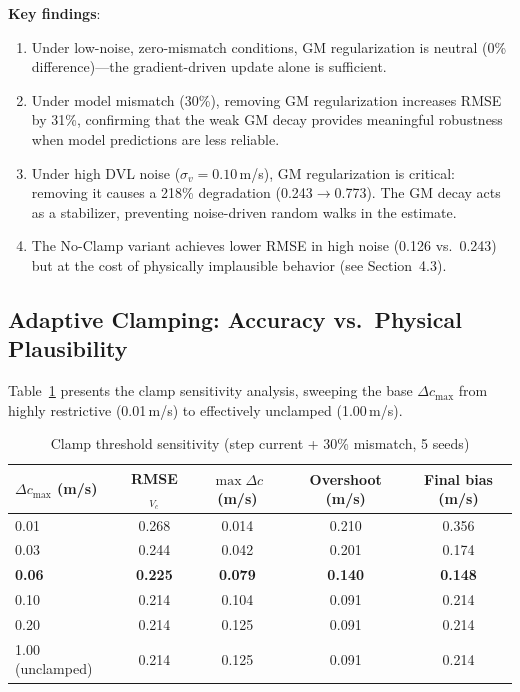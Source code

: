 \textbf{Key findings}:
\begin{enumerate}[itemsep=0pt,topsep=4pt]
    \item Under low-noise, zero-mismatch conditions, GM regularization is neutral (0\% difference)---the gradient-driven update alone is sufficient.
    \item Under model mismatch (30\%), removing GM regularization increases RMSE by 31\%, confirming that the weak GM decay provides meaningful robustness when model predictions are less reliable.
    \item Under high DVL noise ($\sigma_v=0.10$\,m/s), GM regularization is critical: removing it causes a 218\% degradation (0.243$\rightarrow$0.773). The GM decay acts as a stabilizer, preventing noise-driven random walks in the estimate.
    \item The No-Clamp variant achieves lower RMSE in high noise (0.126 vs.\ 0.243) but at the cost of physically implausible behavior (see Section~4.3).
\end{enumerate}

\subsection{Adaptive Clamping: Accuracy vs.\ Physical Plausibility}

Table~\ref{tab:clamp_sensitivity} presents the clamp sensitivity analysis, sweeping the base $\Delta c_{\max}$ from highly restrictive (0.01\,m/s) to effectively unclamped (1.00\,m/s).

\begin{table}[h]
\centering
\caption{Clamp threshold sensitivity (step current + 30\% mismatch, 5 seeds)}
\label{tab:clamp_sensitivity}
\begin{tabular}{lcccc}
\toprule
$\Delta c_{\max}$ (m/s) & RMSE$_{V_c}$ & $\max\Delta c$ (m/s) & Overshoot (m/s) & Final bias (m/s) \\
\midrule
0.01 & 0.268 & 0.014 & 0.210 & 0.356 \\
0.03 & 0.244 & 0.042 & 0.201 & 0.174 \\
\textbf{0.06} & \textbf{0.225} & \textbf{0.079} & \textbf{0.140} & \textbf{0.148} \\
0.10 & 0.214 & 0.104 & 0.091 & 0.214 \\
0.20 & 0.214 & 0.125 & 0.091 & 0.214 \\
1.00 (unclamped) & 0.214 & 0.125 & 0.091 & 0.214 \\
\bottomrule
\end{tabular}
\end{table}

